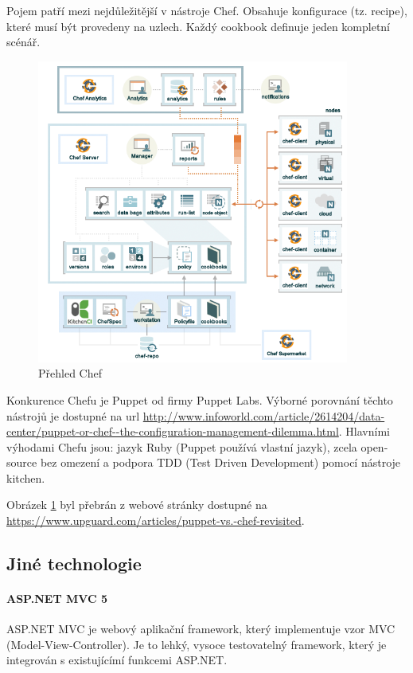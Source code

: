 Pojem  patří mezi nejdůležitější v nástroje Chef. Obsahuje konfigurace (tz. recipe), které musí být provedeny na uzlech. Každý cookbook definuje jeden kompletní scénář. \cite{ChefHandsOnLab}

\begin{figure}[]
  \centering
  \includegraphics[height=10cm]{fig/chef_overview.png}
  \caption{Přehled Chef}
  \label{fig:chefoverview}
\end{figure}

Konkurence Chefu je Puppet od firmy Puppet Labs. Výborné porovnání těchto nástrojů je dostupné na url \url{http://www.infoworld.com/article/2614204/data-center/puppet-or-chef--the-configuration-management-dilemma.html}. Hlavními výhodami Chefu jsou: jazyk Ruby (Puppet používá vlastní jazyk), zcela open-source bez omezení a podpora TDD (Test Driven Development) pomocí nástroje kitchen.

Obrázek \ref{fig:chefoverview} byl přebrán z webové stránky dostupné na \url{https://www.upguard.com/articles/puppet-vs.-chef-revisited}.

\subsection{Jiné technologie}
\paragraph{ASP.NET MVC 5}
ASP.NET MVC je webový aplikační framework, který implementuje vzor MVC (Model-View-Controller). Je to lehký, vysoce testovatelný framework, který je integrován s existujícímí funkcemi ASP.NET. \cite{aspnetmvc}

